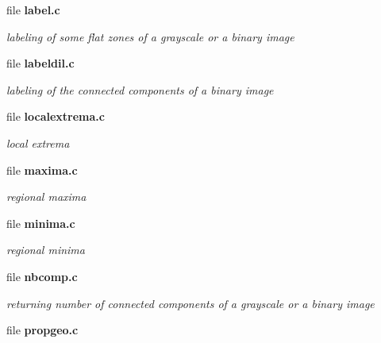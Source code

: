 \begin{DoxyCompactItemize}
\item 
file {\bf label.c}


\begin{DoxyCompactList}\small\item\em labeling of some flat zones of a grayscale or a binary image \item\end{DoxyCompactList}

\item 
file {\bf labeldil.c}


\begin{DoxyCompactList}\small\item\em labeling of the connected components of a binary image \item\end{DoxyCompactList}

\item 
file {\bf localextrema.c}


\begin{DoxyCompactList}\small\item\em local extrema \item\end{DoxyCompactList}

\item 
file {\bf maxima.c}


\begin{DoxyCompactList}\small\item\em regional maxima \item\end{DoxyCompactList}

\item 
file {\bf minima.c}


\begin{DoxyCompactList}\small\item\em regional minima \item\end{DoxyCompactList}

\item 
file {\bf nbcomp.c}


\begin{DoxyCompactList}\small\item\em returning number of connected components of a grayscale or a binary image \item\end{DoxyCompactList}

\item 
file {\bf propgeo.c}



\end{DoxyCompactItemize}
